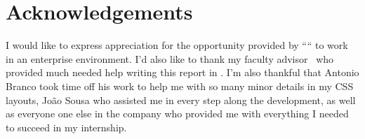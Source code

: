 


% 
% 
% 

\begingroup
\let\clearpage\relax
\let\cleardoublepage\relax
\let\cleardoublepage\relax
\chapter*{Acknowledgements}

I would like to express appreciation for the opportunity provided by ``\company`` to work
in an enterprise environment. I'd also like to thank my faculty advisor \myProf\ 
who provided much needed help writing this report in \LaTeXe. I'm also thankful that 
Antonio Branco took time off his work to help me with so many minor details in my CSS
layouts, João Sousa who assisted me in every step along the development, as well as everyone 
one else in the company who provided me with everything I needed to succeed in my internship.\\



\endgroup



